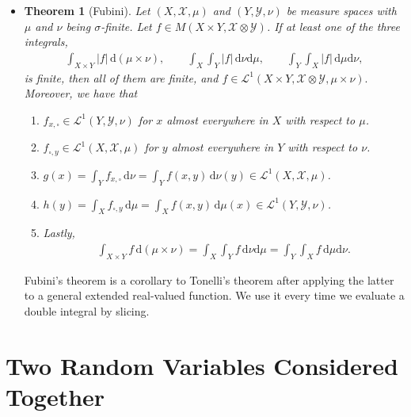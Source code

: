 \documentclass[10pt]{article}
\newtheorem{theorem}[lemma]{Theorem}
\numberwithin{lemma}{section}
\newcommand{\dee}{\mathrm{d}}
\newcommand{\mcal}[1]{\mathcal{#1}}
\begin{document}
\begin{itemize}
  \item \begin{theorem}[Fubini]
    Let $(X, \mcal{X}, \mu)$ and $(Y, \mcal{Y}, \nu)$ be measure spaces with $\mu$ and $\nu$ being $\sigma$-finite. Let $f \in M(X \times Y, \mcal{X} \otimes \mcal{Y})$. If at least one of the three integrals,
    \begin{align*}
      \int_{X \times Y} |f|\, \dee(\mu \times \nu), \qquad \int_X \int_Y |f|\, \dee\nu\dee\mu,\qquad \int_Y \int_X |f|\, \dee\mu \dee\nu,
    \end{align*}
    is finite, then all of them are finite, and $f \in \mcal{L}^1(X \times Y, \mcal{X} \otimes \mcal{Y}, \mu \times \nu).$ Moreover, we have that
    \begin{enumerate}
      \item $f_{x,\square} \in \mcal{L}^1(Y,\mcal{Y},\nu)$ for $x$ almost everywhere in $X$ with respect to $\mu$.
      \item $f_{\square,y} \in \mcal{L}^1(X,\mcal{X},\mu)$ for $y$ almost everywhere in $Y$ with respect to $\nu$. 
      \item $g(x) = \int_Y f_{x,\square}\, \dee\nu = \int_Y f(x,y)\, \dee\nu(y) \in \mcal{L}^1(X,\mcal{X},\mu)$.
      \item $h(y) = \int_X f_{\square, y}\, \dee\mu = \int_X f(x,y)\, \dee\mu(x) \in \mcal{L}^1(Y,\mcal{Y},\nu)$.
      \item Lastly,
      \begin{align*}
        \int_{X \times Y} f\, \dee(\mu \times \nu) = \int_X \int_Y f\, \dee\nu\dee\mu = \int_Y \int_X f\, \dee\mu \dee\nu.
      \end{align*}   
    \end{enumerate}
  \end{theorem}
  Fubini's theorem is a corollary to Tonelli's theorem after applying the latter to a general extended real-valued function. We use it every time we evaluate a double integral by slicing.
\end{itemize}

\section{Two Random Variables Considered Together}
\end{document}
